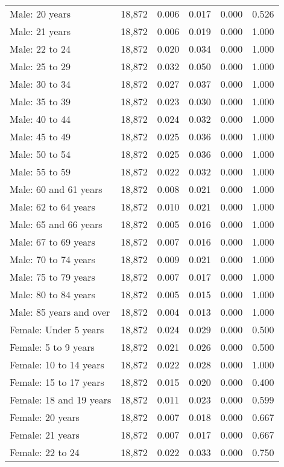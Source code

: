 \begin{longtable}{@{\extracolsep{5pt}}lccccc}
Male: 20 years & 18,872 & 0.006 & 0.017 & 0.000 & 0.526 \\ 
Male: 21 years & 18,872 & 0.006 & 0.019 & 0.000 & 1.000 \\ 
Male: 22 to 24 & 18,872 & 0.020 & 0.034 & 0.000 & 1.000 \\ 
Male: 25 to 29 & 18,872 & 0.032 & 0.050 & 0.000 & 1.000 \\ 
Male: 30 to 34 & 18,872 & 0.027 & 0.037 & 0.000 & 1.000 \\ 
Male: 35 to 39 & 18,872 & 0.023 & 0.030 & 0.000 & 1.000 \\ 
Male: 40 to 44 & 18,872 & 0.024 & 0.032 & 0.000 & 1.000 \\ 
Male: 45 to 49 & 18,872 & 0.025 & 0.036 & 0.000 & 1.000 \\ 
Male: 50 to 54 & 18,872 & 0.025 & 0.036 & 0.000 & 1.000 \\ 
Male: 55 to 59 & 18,872 & 0.022 & 0.032 & 0.000 & 1.000 \\ 
Male: 60 and 61 years & 18,872 & 0.008 & 0.021 & 0.000 & 1.000 \\ 
Male: 62 to 64 years & 18,872 & 0.010 & 0.021 & 0.000 & 1.000 \\ 
Male: 65 and 66 years & 18,872 & 0.005 & 0.016 & 0.000 & 1.000 \\ 
Male: 67 to 69 years & 18,872 & 0.007 & 0.016 & 0.000 & 1.000 \\ 
Male: 70 to 74 years & 18,872 & 0.009 & 0.021 & 0.000 & 1.000 \\ 
Male: 75 to 79 years & 18,872 & 0.007 & 0.017 & 0.000 & 1.000 \\ 
Male: 80 to 84 years & 18,872 & 0.005 & 0.015 & 0.000 & 1.000 \\ 
Male: 85 years and over & 18,872 & 0.004 & 0.013 & 0.000 & 1.000 \\ 
Female: Under 5 years & 18,872 & 0.024 & 0.029 & 0.000 & 0.500 \\ 
Female: 5 to 9 years & 18,872 & 0.021 & 0.026 & 0.000 & 0.500 \\ 
Female: 10 to 14 years & 18,872 & 0.022 & 0.028 & 0.000 & 1.000 \\ 
Female: 15 to 17 years & 18,872 & 0.015 & 0.020 & 0.000 & 0.400 \\ 
Female: 18 and 19 years & 18,872 & 0.011 & 0.023 & 0.000 & 0.599 \\ 
Female: 20 years & 18,872 & 0.007 & 0.018 & 0.000 & 0.667 \\ 
Female: 21 years & 18,872 & 0.007 & 0.017 & 0.000 & 0.667 \\ 
Female: 22 to 24 & 18,872 & 0.022 & 0.033 & 0.000 & 0.750 \\ 

\end{longtable}

